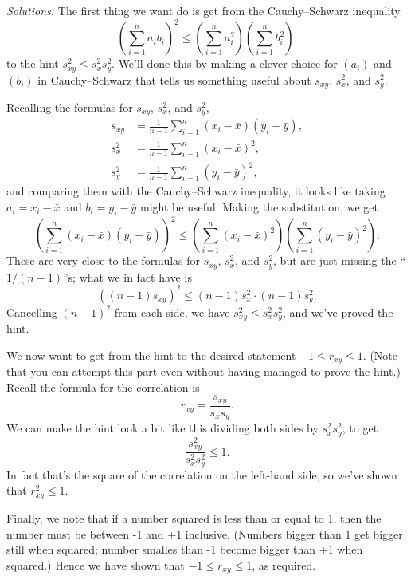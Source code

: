 \documentclass[
  a4paper,
]{book}
\theoremstyle{definition}
\theoremstyle{definition}
\theoremstyle{definition}
\theoremstyle{definition}
\theoremstyle{remark}
\begin{document}
\begin{myanswers}
\emph{Solutions.}
The first thing we want do is get from the Cauchy--Schwarz inequality
\[ \left( \sum_{i=1}^n a_i b_i \right)^2 \leq \left( \sum_{i=1}^n a_i^2 \right) \left(\sum_{i=1}^n b_i^2 \right) . \]
to the hint \(s_{xy}^2 \leq s_x^2 s_y^2\). We'll done this by making a clever choice for \((a_i)\) and \((b_i)\) in Cauchy--Schwarz that tells us something useful about \(s_{xy}\), \(s_x^2\), and \(s_y^2\).

Recalling the formulas for \(s_{xy}\), \(s_x^2\), and \(s_y^2\),
\begin{align*}
s_{xy} &= \frac{1}{n-1} \sum_{i=1}^n (x_i - \bar x)(y_i - \bar y) ,\\
s_{x}^2 &= \frac{1}{n-1} \sum_{i=1}^n (x_i - \bar x)^2 ,\\
s_{y}^2 &= \frac{1}{n-1} \sum_{i=1}^n (y_i - \bar y)^2 ,
\end{align*}
and comparing them with the Cauchy--Schwarz inequality, it looks like taking \(a_i = x_i - \bar x\) and \(b_i = y_i - \bar y\) might be useful. Making the substitution, we get
\[ \left( \sum_{i=1}^n (x_i - \bar x)(y_i - \bar y) \right)^2 \leq \left( \sum_{i=1}^n (x_i - \bar x)^2 \right) \left(\sum_{i=1}^n (y_i - \bar y)^2 \right) . \]
These are very close to the formulas for \(s_{xy}\), \(s_x^2\), and \(s_y^2\), but are just missing the ``\(1/(n-1)\)''s; what we in fact have is
\[ \left( (n-1) s_{xy} \right)^2 \leq (n-1)s_x^2 \cdot (n-1) s_y^2 .\]
Cancelling \((n-1)^2\) from each side, we have \(s_{xy}^2 \leq s_x^2 s_y^2\), and we've proved the hint.

We now want to get from the hint to the desired statement \(-1 \leq r_{xy} \leq 1\). (Note that you can attempt this part even without having managed to prove the hint.) Recall the formula for the correlation is
\[ r_{xy} = \frac{s_{xy}}{s_xs_y} . \]
We can make the hint look a bit like this dividing both sides by \(s_x^2 s_y^2\), to get
\[\frac{s_{xy}^2}{s_x^2 s_y^2} \leq 1.   \]
In fact that's the square of the correlation on the left-hand side, so we've shown that \(r_{xy}^2 \leq 1\).

Finally, we note that if a number squared is less than or equal to 1, then the number must be between -1 and +1 inclusive. (Numbers bigger than 1 get bigger still when squared; number smalles than -1 become bigger than +1 when squared.) Hence we have shown that \(-1 \leq r_{xy} \leq 1\), as required.

\end{myanswers}
\end{document}
